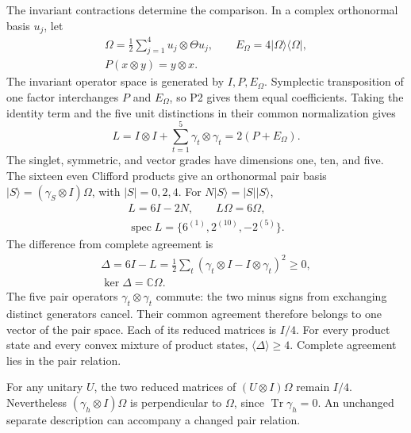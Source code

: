 \documentclass[aps,prx,reprint,longbibliography]{revtex4-2}
\providecommand{\Tr}{\operatorname{Tr}}
\providecommand{\spec}{\operatorname{spec}}
\providecommand{\C}{\mathbb C}
\begin{document}
The invariant contractions determine the comparison. In a complex orthonormal basis $u_j$, let
\begin{equation}
 \begin{gathered}
 \Omega=\frac12\sum_{j=1}^4u_j\otimes\Theta u_j,\qquad
 E_\Omega=4|\Omega\rangle\langle\Omega|,\\
 P(x\otimes y)=y\otimes x.
 \end{gathered}
 \label{eq:singlet}
\end{equation}
The invariant operator space is generated by $I,P,E_\Omega$. Symplectic transposition of one factor interchanges $P$ and $E_\Omega$, so P2 gives them equal coefficients. Taking the identity term and the five unit distinctions in their common normalization gives
\begin{equation}
 L=I\otimes I+\sum_{t=1}^5\gamma_t\otimes\gamma_t
   =2(P+E_\Omega).
 \label{eq:comparison}
\end{equation}
The singlet, symmetric, and vector grades have dimensions one, ten, and five. The sixteen even Clifford products give an orthonormal pair basis $\lvert S\rangle=(\gamma_S\otimes I)\Omega$, with $|S|=0,2,4$. For $N\lvert S\rangle=|S|\lvert S\rangle$,
\begin{equation}
 \begin{gathered}
 L=6I-2N,\qquad L\Omega=6\Omega,\\
 \spec L=\{6^{(1)},2^{(10)},-2^{(5)}\}.
 \end{gathered}
 \label{eq:spectrum}
\end{equation}
The difference from complete agreement is
\begin{equation}
 \begin{gathered}
 \Delta=6I-L
 =\frac12\sum_t(\gamma_t\otimes I-I\otimes\gamma_t)^2\geq0,\\
 \ker\Delta=\C\Omega.
 \end{gathered}
 \label{eq:disagreement}
\end{equation}
The five pair operators $\gamma_t\otimes\gamma_t$ commute: the two minus signs from exchanging distinct generators cancel. Their common agreement therefore belongs to one vector of the pair space. Each of its reduced matrices is $I/4$. For every product state and every convex mixture of product states, $\langle\Delta\rangle\geq4$. Complete agreement lies in the pair relation.

For any unitary $U$, the two reduced matrices of $(U\otimes I)\Omega$ remain $I/4$. Nevertheless $(\gamma_h\otimes I)\Omega$ is perpendicular to $\Omega$, since $\Tr\gamma_h=0$. An unchanged separate description can accompany a changed pair relation.
\end{document}
